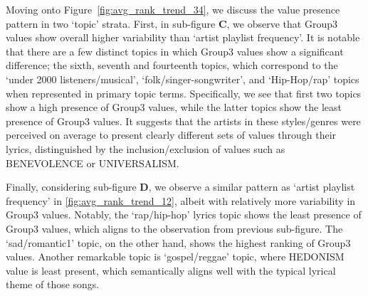 \documentclass{article}
\begin{document}

Moving onto Figure~\ref{fig:avg_rank_trend_34}, we discuss the value presence pattern in two `topic' strata. First, in sub-figure \textbf{C}, we observe that Group3 values show overall higher variability than `artist playlist frequency'. It is notable that there are a few distinct topics in which Group3 values show a significant difference; the sixth, seventh and fourteenth topics, which correspond to the `under 2000 listeners/musical', `folk/singer-songwriter', and `Hip-Hop/rap' topics when represented in primary topic terms. Specifically, we see that first two topics show a high presence of Group3 values, while the latter topics show the least presence of Group3 values. It suggests that the artists in these styles/genres were perceived on average to present clearly different sets of values through their lyrics, distinguished by the inclusion/exclusion of values such as BENEVOLENCE or UNIVERSALISM.


Finally, considering sub-figure \textbf{D}, we observe a similar pattern as `artist playlist frequency' in \ref{fig:avg_rank_trend_12}, albeit with relatively more variability in Group3 values. Notably, the `rap/hip-hop' lyrics topic shows the least presence of Group3 values, which aligns to the observation from previous sub-figure. The `sad/romantic1' topic, on the other hand, shows the highest ranking of Group3 values. Another remarkable topic is `gospel/reggae' topic, where HEDONISM value is least present, which semantically aligns well with the typical lyrical theme of those songs.
\end{document}
